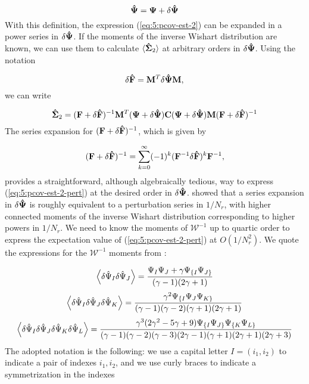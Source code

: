 \begin{equation}
\label{eq:5:deltapsi}
\mathbf{\hat{\Psi}} = \mathbf{\Psi} + \delta\mathbf{\hat{\Psi}}
\end{equation}
%
With this definition, the expression (\ref{eq:5:pcov-est-2}) can be expanded in a power series in $\delta\mathbf{\hat{\Psi}}$. If the moments of the inverse Wishart distribution are known, we can use them to calculate $\langle\mathbf{\hat{\Sigma}}_2\rangle$ at arbitrary orders in $\delta\mathbf{\hat{\Psi}}$. Using the notation

\begin{equation}
\label{eq:5:deltaF}
\delta\mathbf{\hat{F}} = \mathbf{M}^T\delta\mathbf{\hat{\Psi}}\mathbf{M},
\end{equation}
%
we can write

\begin{equation}
\label{eq:5:pcov-est-2-pert}
\mathbf{\hat{\Sigma}}_2 = (\mathbf{F}+\delta\mathbf{\hat{F}})^{-1}\mathbf{M}^T(\mathbf{\Psi}+\delta\mathbf{\hat{\Psi}})\mathbf{C}(\mathbf{\Psi}+\delta\mathbf{\hat{\Psi}})\mathbf{M}(\mathbf{F}+\delta\mathbf{\hat{F}})^{-1}
\end{equation}
%
The series expansion for $(\mathbf{F}+\delta\mathbf{\hat{F}})^{-1}$, which is given by

\begin{equation}
\label{eq:5:seriesdF}
(\mathbf{F}+\delta\mathbf{\hat{F}})^{-1} = \sum_{k=0}^\infty (-1)^k(\mathbf{F}^{-1}\delta\mathbf{\hat{F}})^k\mathbf{F}^{-1},
\end{equation}
%
provides a straightforward, although algebraically tedious, way to express (\ref{eq:5:pcov-est-2-pert}) at the desired order in $\delta\mathbf{\hat{\Psi}}$. \citep{MasumotoWishart} showed that a series expansion in $\delta\mathbf{\hat{\Psi}}$ is roughly equivalent to a perturbation series in $1/N_r$, with higher connected moments of the inverse Wishart distribution corresponding to higher powers in $1/N_r$. We need to know the moments of $\mathcal{W}^{-1}$ up to quartic order \citep{PetriVariance} to express the expectation value of (\ref{eq:5:pcov-est-2-pert}) at $O(1/N_r^2)$. We quote the expressions for the $\mathcal{W}^{-1}$ moments from \citep{MasumotoWishart}:

\begin{equation}
\label{eq:5:inv-wishart-moments-2}
\left\langle\delta\hat{\Psi}_I\delta\hat{\Psi}_J\right\rangle = \frac{\Psi_I\Psi_J + \gamma\Psi_{\{ I}\Psi_{J\}}}{(\gamma-1)(2\gamma+1)}
\end{equation}
%
\begin{equation}
\label{eq:5:inv-wishart-moments-3}
\left\langle\delta\hat{\Psi}_I\delta\hat{\Psi}_J\delta\hat{\Psi}_K\right\rangle = \frac{\gamma^2\Psi_{\{ I}\Psi_J\Psi_{K\}}}{(\gamma-1)(\gamma-2)(\gamma+1)(2\gamma+1)}
\end{equation}
%
\begin{equation}
\label{eq:5:inv-wishart-moments-4}
\left\langle\delta\hat{\Psi}_I\delta\hat{\Psi}_J\delta\hat{\Psi}_K\delta\hat{\Psi}_L\right\rangle = \frac{\gamma^3(2\gamma^2-5\gamma+9)\Psi_{\{ I}\Psi_{J\}}\Psi_{\{ K}\Psi_{L\}}}{(\gamma-1)(\gamma-2)(\gamma-3)(2\gamma-1)(\gamma+1)(2\gamma+1)(2\gamma+3)}
\end{equation}
%
The adopted notation is the following: we use a capital letter $I=(i_1,i_2)$ to indicate a pair of indexes $i_1,i_2$, and we use curly braces to indicate a symmetrization in the indexes

